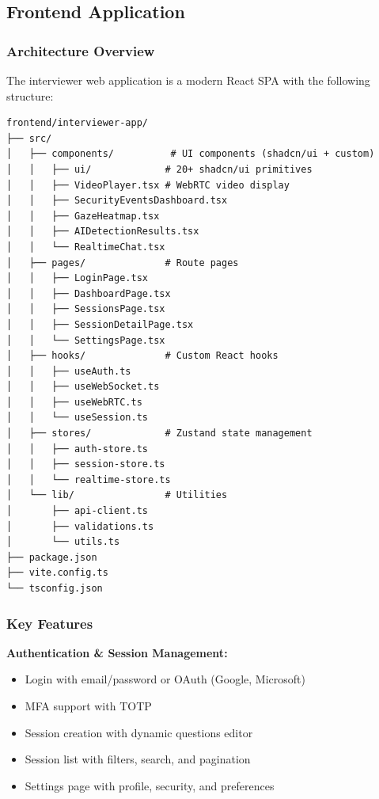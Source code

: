\documentclass[11pt,letterpaper]{article}
\begin{document}
\subsection{Frontend Application}

\subsubsection{Architecture Overview}

The interviewer web application is a modern React SPA with the following structure:

\begin{lstlisting}[caption=Frontend Directory Structure]
frontend/interviewer-app/
├── src/
│   ├── components/          # UI components (shadcn/ui + custom)
│   │   ├── ui/             # 20+ shadcn/ui primitives
│   │   ├── VideoPlayer.tsx # WebRTC video display
│   │   ├── SecurityEventsDashboard.tsx
│   │   ├── GazeHeatmap.tsx
│   │   ├── AIDetectionResults.tsx
│   │   └── RealtimeChat.tsx
│   ├── pages/              # Route pages
│   │   ├── LoginPage.tsx
│   │   ├── DashboardPage.tsx
│   │   ├── SessionsPage.tsx
│   │   ├── SessionDetailPage.tsx
│   │   └── SettingsPage.tsx
│   ├── hooks/              # Custom React hooks
│   │   ├── useAuth.ts
│   │   ├── useWebSocket.ts
│   │   ├── useWebRTC.ts
│   │   └── useSession.ts
│   ├── stores/             # Zustand state management
│   │   ├── auth-store.ts
│   │   ├── session-store.ts
│   │   └── realtime-store.ts
│   └── lib/                # Utilities
│       ├── api-client.ts
│       ├── validations.ts
│       └── utils.ts
├── package.json
├── vite.config.ts
└── tsconfig.json
\end{lstlisting}

\subsubsection{Key Features}

\textbf{Authentication \& Session Management:}
\begin{itemize}[noitemsep]
    \item Login with email/password or OAuth (Google, Microsoft)
    \item MFA support with TOTP
    \item Session creation with dynamic questions editor
    \item Session list with filters, search, and pagination
    \item Settings page with profile, security, and preferences
\end{itemize}
\end{document}
